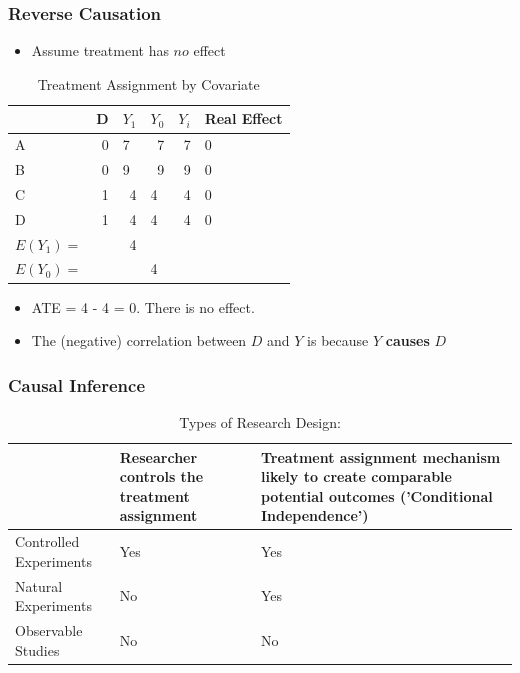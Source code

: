 \documentclass[xcolor=x11names,compress]{beamer}\usepackage[]{graphicx}\usepackage[]{color}
\renewcommand{\(}{\begin{columns}}
\renewcommand{\)}{\end{columns}}
\newcommand{\<}[1]{\begin{column}{#1}}
\renewcommand{\>}{\end{column}}
\begin{document}
\begin{frame}
\frametitle{Reverse Causation}
\begin{itemize}
\item Assume treatment has $no$ effect
\end{itemize}
\begin{table}[htbp]
  \centering
  \caption{Treatment Assignment by Covariate}
    \begin{tabular}{|l|r|r|l|r|l|}
    \hline
          &  \multicolumn{1}{l|}{D} & \multicolumn{1}{l|}{$Y_1$} & $Y_0$  & \multicolumn{1}{l|}{$Y_i$} & Real Effect \bigstrut\\
    \hline
    A     & 0     & \multicolumn{1}{l|}{7} & \multicolumn{1}{r|}{\cellcolor{teal}7} & 7     & 0 \bigstrut\\
    \hline
    B     & 0     & \multicolumn{1}{l|}{9} & \multicolumn{1}{r|}{\cellcolor{teal}9} & 9     & 0 \bigstrut\\
    \hline
    C     &  1     & \cellcolor{teal}4     & 4     & 4     & 0 \bigstrut\\
    \hline
    D     & 1     & \cellcolor{teal}4     & 4     & 4     & 0 \bigstrut\\
    \hline\pause
    $E(Y_1)=$ & & 4 & & \bigstrut\\
    \hline
    $E(Y_0)=$ &  & & 4 & \bigstrut\\
    \hline
    \end{tabular}%
  \label{tab:addlabel}%
\end{table}%
\begin{itemize}
\pause
\item ATE = 4 - 4 = 0. There is no effect. 
\item The (negative) correlation between $D$ and $Y$ is because $Y$ \textbf{causes} $D$
\end{itemize}
\end{frame}


\begin{frame}
\frametitle{Causal Inference}
\begin{table}[htbp]
  \centering
  \caption{Types of Research Design:}
    \begin{tabular}{|p{3.5cm}|p{3.5cm}|p{3.5cm}|}
    \toprule
          & Researcher controls the treatment assignment & Treatment assignment mechanism likely to create comparable potential outcomes ('Conditional Independence') \\
    \midrule
    Controlled Experiments & Yes   & Yes \\
    \midrule
    Natural Experiments & No    & Yes \\
    \midrule
    Observable Studies & No    & No \\
    \bottomrule
    \end{tabular}%
  \label{tab:addlabel}%
\end{table}%
\end{frame}
\end{document}
